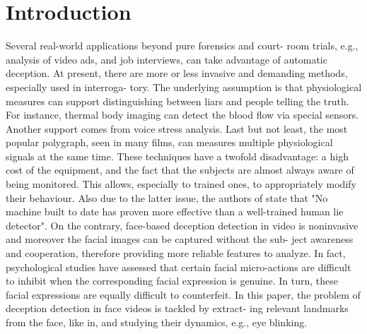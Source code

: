 \documentclass[12pt]{article}
\begin{document}
\section{Introduction}

Several real-world applications beyond pure forensics and court-
room trials, e.g., analysis of video ads, and job interviews, can take
advantage of automatic deception. At present, there are more or
less invasive and demanding methods, especially used in interroga-
tory. The underlying assumption is that physiological measures
can support distinguishing between liars and people telling the
truth. For instance, thermal body imaging can detect the blood
flow via special sensors. Another support comes from voice stress
analysis. Last but not least, the most popular polygraph,
seen in many films, can measures multiple physiological signals at
the same time. These techniques have a twofold disadvantage: a
high cost of the equipment, and the fact that the subjects are almost
always aware of being monitored. This allows, especially to trained
ones, to appropriately modify their behaviour. Also due to the latter
issue, the authors of state that "No machine built to date has
proven more effective than a well-trained human lie detector". On
the contrary, face-based deception detection in video is noninvasive
and moreover the facial images can be captured without the sub-
ject awareness and cooperation, therefore providing more reliable
features to analyze. In fact, psychological studies have assessed
that certain facial micro-actions are difficult to inhibit when the
corresponding facial expression is genuine. In turn, these facial
expressions are equally difficult to counterfeit. In this paper, the
problem of deception detection in face videos is tackled by extract-
ing relevant landmarks from the face, like in, and studying their
dynamics, e.g., eye blinking.
\end{document}
